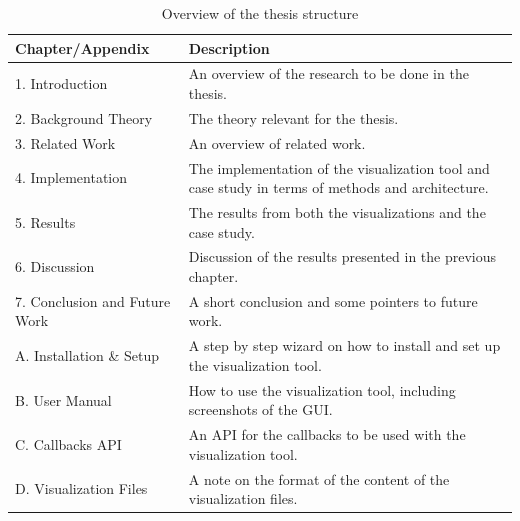 \begin{table}[!h]
\begin{center}
\begin{tabular}{ | l | p{8cm} |}
\hline
\textbf{Chapter/Appendix} & \textbf{Description} \\ \hline
1. Introduction & An overview of the research to be done in the thesis. \\ \hline
2. Background Theory & The theory relevant for the thesis. \\ \hline
3. Related Work & An overview of related work. \\ \hline
4. Implementation & The implementation of the visualization tool and case study in terms of methods and architecture. \\ \hline
5. Results & The results from both the visualizations and the case study. \\ \hline
6. Discussion & Discussion of the results presented in the previous chapter. \\ \hline
7. Conclusion and Future Work & A short conclusion and some pointers to future work. \\ \hline
A. Installation \& Setup & A step by step wizard on how to install and set up the visualization tool. \\ \hline
B. User Manual & How to use the visualization tool, including screenshots of the GUI. \\ \hline
C. Callbacks API & An API for the callbacks to be used with the visualization tool. \\ \hline
D. Visualization Files & A note on the format of the content of the visualization files. \\ \hline
\end{tabular}
\end{center}
\caption{Overview of the thesis structure}
\label{tab:thesis-structure}
\end{table}

\cleardoublepage